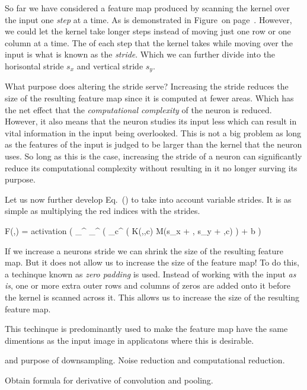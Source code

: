 \startsubsubsection[title=The stride]
So far we have considered a feature map produced by scanning the kernel over the input one {\em step} at a time.
As is demonstrated in Figure~ on page~.
However, we could let the kernel take longer steps instead of moving just one row or one column at a time.
The  of each step that the kernel takes while moving over the input is what is known as the {\em stride}.
Which we can further divide into the horisontal stride $s_x$ and vertical stride $s_y$.

What purpose does altering the stride serve?
Increasing the stride reduces the size of the resulting feature map since it is computed at fewer areas.
Which has the net effect that the {\em computational complexity} of the neuron is reduced.
However, it also means that the neuron studies its input less which can result in vital information in the input being overlooked.
This is not a big problem as long as the features of the input is judged to be larger than the kernel that the neuron uses.
So long as this is the case, increasing the stride of a neuron can significantly reduce its computational complexity without resulting in it no longer surving its purpose.

Let us now further develop Eq.~() to take into account variable strides.
It is as simple as multiplying the red indices with the strides.

\startplaceformula[reference=devel-feature-5]
\startformula
F(\color[red]{x},\color[red]{y})
=
{\rm activation}
\left( 
\sum_{\color[blue]{y}}^{}
\sum_{\color[blue]{x}}^{}
\left(
\sum_{c}^{}
\Bigl(
K(\color[blue]{x},\color[blue]{y},c)
\cdot
M(\color[red]{x}s_x + \color[blue]{x}, \color[red]{y}s_y + \color[blue]{y},c)
\right)
+
b
\right)
\stopformula
\stopplaceformula
\stopsubsubsection

\startsubsubsection[title=Zero padding]
If we increase a neurons stride we can shrink the size of the resulting feature map.
But it does not allow us to increase the size of the feature map!
To do this, a techinque known as {\em zero padding} is used.
Instead of working with the input {\em as is}, one or more extra outer rows and columns of zeros are added onto it before the kernel is scanned across it.
This allows us to increase the size of the resulting feature map.

This techinque is predominantly used to make the feature map have the same dimentions as the input image in applicatons where this is desirable.
\stopsubsubsection



 and purpose of downsampling.
Noise reduction and computational reduction.
\stopsubsection

\startsubsection[title=Backward Propagation]
Obtain formula for derivative of convolution and pooling.
\stopsubsection
\stopsection
